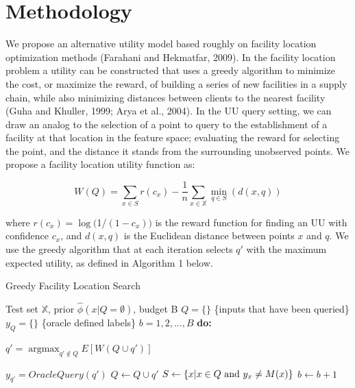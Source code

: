 \documentclass[letterpaper]{article} %
\DeclareMathOperator*{\argmax}{argmax}
\newcommand{\km}[1]{{\color{red} #1}} %
\begin{document}
\section{Methodology}

We propose an alternative utility model based roughly on facility location optimization methods  \km{(Farahani and Hekmatfar, 2009)}. In the facility location problem a utility can be constructed that uses a greedy algorithm to minimize the cost, or maximize the reward, of building a series of new facilities in a supply chain, while also minimizing distances between clients to the nearest facility  \km{(Guha and Khuller, 1999; Arya et al., 2004)}. In the UU query setting, we can draw an analog to the selection of a point to query to the establishment of a facility at that location in the feature space; evaluating the reward for selecting the point, and the distance it stands from the surrounding unobserved points. We propose a facility location utility function as: 

$$W(Q) = \sum_{x \in S} r \left(c_x\right) - \frac{1}{n} \sum_{x \in \mathbb{X}} \min_{q \in S}\left(d\left(x,q\right)\right)$$

where $r\left(c_x\right) = \log($1/$(1-c_x))$ is the reward function for finding an UU with confidence $c_{x}$, and $d(x,q)$ is the Euclidean distance between points $x$ and $q$. We use the greedy algorithm that at each iteration selects $q'$ with the maximum expected utility, as defined in Algorithm 1 below. 

\begin{algorithm}
	\caption{Greedy Facility Location Search}
	\label{alg:Greedy}
	\begin{algorithmic}
		 Test set $\mathbb{X}$, prior $\hat{\phi}\left(x|Q=\emptyset\right)$, budget B
		\STATE $Q=\{\}$ \{inputs that have been queried\}
		\STATE $y_Q = \{\}$ \{oracle defined labels\}
		 $b = 1, 2, ..., B$ {\bfseries do:}

		\STATE $q' = \argmax_{q' \not\in Q} E \left[W\left(Q \cup q'\right) \right]$
		
		\STATE $y_{q'} = OracleQuery(q')$
		\STATE $Q \leftarrow Q \cup q'$
		\STATE $S \leftarrow \left\{x | x \in Q \space \text{ and } y_x \neq M(x) \right\}$
		\STATE $b \leftarrow b + 1$
			

	\end{algorithmic}
\end{algorithm}
\end{document}
